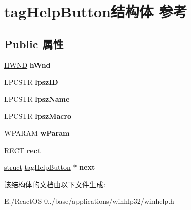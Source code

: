 \hypertarget{structtag_help_button}{}\section{tag\+Help\+Button结构体 参考}
\label{structtag_help_button}
\subsection*{Public 属性}
\begin{DoxyCompactItemize}
\item 
\mbox{\label{structtag_help_button_a933eacd928509429dead140c1e2035cd}} 
\hyperlink{interfacevoid}{H\+W\+ND} {\bfseries h\+Wnd}
\item 
\mbox{\label{structtag_help_button_ae65286e3ce9f19c363bd9bca9ab9936c}} 
L\+P\+C\+S\+TR {\bfseries lpsz\+ID}
\item 
\mbox{\label{structtag_help_button_addec9f703e6f8e221925cd1efc492e6e}} 
L\+P\+C\+S\+TR {\bfseries lpsz\+Name}
\item 
\mbox{\label{structtag_help_button_a3273209b2b6f460789179bbf94a79db3}} 
L\+P\+C\+S\+TR {\bfseries lpsz\+Macro}
\item 
\mbox{\label{structtag_help_button_a6f0c29f67276d9bf59c61f2a3bdfb177}} 
W\+P\+A\+R\+AM {\bfseries w\+Param}
\item 
\mbox{\label{structtag_help_button_ad68a110baa7a31b7ec8852be0e2314b3}} 
\hyperlink{structtag_r_e_c_t}{R\+E\+CT} {\bfseries rect}
\item 
\mbox{\label{structtag_help_button_a4fbd8fb812f9231236641761628b4a6e}} 
\hyperlink{interfacestruct}{struct} \hyperlink{structtag_help_button}{tag\+Help\+Button} $\ast$ {\bfseries next}
\end{DoxyCompactItemize}


该结构体的文档由以下文件生成\+:\begin{DoxyCompactItemize}
\item 
E\+:/\+React\+O\+S-\/0../base/applications/winhlp32/winhelp.\+h\end{DoxyCompactItemize}
